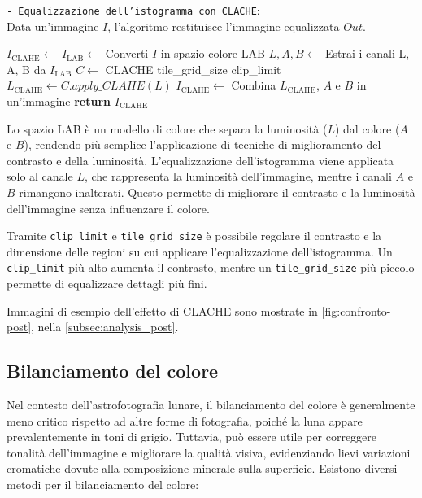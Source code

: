 \begin{algorithm}[H]
    \caption{\texttt{- Equalizzazione dell'istogramma con CLACHE}:\\ Data un'immagine $I$, l'algoritmo restituisce l'immagine equalizzata $Out$.} \label{alg:clache}
    \begin{algorithmic}
            \State $I_{\text{CLAHE}} \gets$ 
            \State $I_{\text{LAB}} \gets$ Converti $I$ in spazio colore LAB
            \State $L, A, B \gets$ Estrai i canali L, A, B da $I_{\text{LAB}}$
            \State $C \gets$  CLACHE  tile\_grid\_size  clip\_limit
            \State $L_{\text{CLAHE}} \gets C.apply\_CLAHE(L)$ 
            \State $I_{\text{CLAHE}} \gets$ Combina $L_{\text{CLAHE}}$, $A$ e $B$ in un'immagine
            \State \textbf{return} $I_{\text{CLAHE}}$
        \EndFunction
    \end{algorithmic}
\end{algorithm}

Lo spazio LAB è un modello di colore che separa la luminosità ($L$) dal colore ($A$ e $B$), rendendo più semplice l'applicazione di tecniche di miglioramento del contrasto e della luminosità. L'equalizzazione dell'istogramma viene applicata solo al canale $L$, che rappresenta la luminosità dell'immagine, mentre i canali $A$ e $B$ rimangono inalterati. Questo permette di migliorare il contrasto e la luminosità dell'immagine senza influenzare il colore.

Tramite \texttt{clip\_limit} e \texttt{tile\_grid\_size} è possibile regolare il contrasto e la dimensione delle regioni su cui applicare l'equalizzazione dell'istogramma. Un \texttt{clip\_limit} più alto aumenta il contrasto, mentre un \texttt{tile\_grid\_size} più piccolo permette di equalizzare dettagli più fini.

Immagini di esempio dell'effetto di CLACHE sono mostrate in \cref{fig:confronto-post}, nella \cref{subsec:analysis_post}.

\subsection{Bilanciamento del colore} \label{subsec:color_balance}

Nel contesto dell'astrofotografia lunare, il bilanciamento del colore è generalmente meno critico rispetto ad altre forme di fotografia, poiché la luna appare prevalentemente in toni di grigio. Tuttavia, può essere utile per correggere tonalità dell'immagine e migliorare la qualità visiva, evidenziando lievi variazioni cromatiche dovute alla composizione minerale sulla superficie. Esistono diversi metodi per il bilanciamento del colore:

